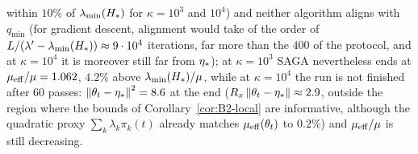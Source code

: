 \begin{remark}
\begin{enumerate}[label=(\alph*),leftmargin=*,topsep=2pt,itemsep=1pt]
within $10\%$ of $\lambda_{\min}(H_\ast)$ for $\kappa=10^3$ and $10^4$) and neither algorithm aligns with $q_{\min}$
(for gradient descent, alignment would take of the order of $L/(\lambda'-\lambda_{\min}(H_\ast))\approx9\cdot10^4$ iterations, far
more than the $400$ of the protocol, and at $\kappa=10^4$ it is moreover still far from $\eta_\ast$); at $\kappa=10^3$
SAGA nevertheless ends at $\mu_{\mathrm{eff}}/\mu=1.062$, $4.2\%$ above $\lambda_{\min}(H_\ast)/\mu$, while at $\kappa=10^4$ the run is not
finished after $60$ passes: $\left\|\theta_t-\eta_\ast\right\|^2=8.6$ at the end ($R_x\left\|\theta_t-\eta_\ast\right\|\approx2.9$, outside
the region where the bounds of Corollary~\ref{cor:B2-local} are informative, although the quadratic proxy
$\sum_k\lambda_k\pi_k(t)$ already matches $\mu_{\mathrm{eff}}(\theta_t)$ to $0.2\%$) and $\mu_{\mathrm{eff}}/\mu$ is still decreasing.
\end{enumerate}


\end{remark}
